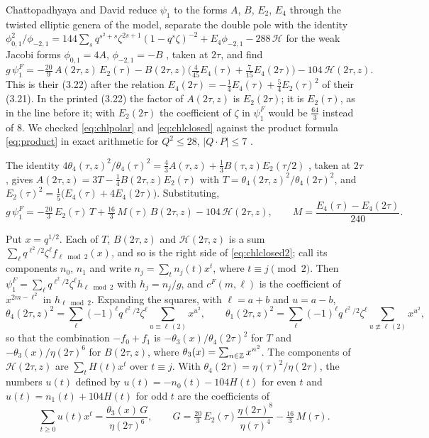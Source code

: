  Chattopadhyaya and David \cite[(3.12)--(3.22)]{CD19} reduce $\psi_1$ to the forms $A$, $B$, $E_2$, $E_4$ through the twisted elliptic genera of the model, separate the double pole with the identity $\phi_{0,1}^2/\phi_{-2,1}=144\sum_s q^{s^2+s}\zeta^{2s+1}(1-q^s\zeta)^{-2}+E_4\phi_{-2,1}-288\,\mathcal H$ for the weak Jacobi forms $\phi_{0,1}=4A$, $\phi_{-2,1}=-B$ \cite[Section~3]{BringmannMurthy13}, taken at $2\tau$, and find
\begin{equation}\label{eq:chlclosed}
g\,\psi_1^F=-\tfrac{20}{9}\,A(2\tau,z)\,E_2(\tau)-B(2\tau,z)\big(\tfrac4{45}E_4(\tau)+\tfrac7{15}E_4(2\tau)\big)-104\,\mathcal H(2\tau,z).
\end{equation}
This is their (3.22) after the relation $E_4(2\tau)=-\tfrac14E_4(\tau)+\tfrac54E_2(\tau)^2$ of their (3.21). In the printed (3.22) the factor of $A(2\tau,z)$ is $E_2(2\tau)$; it is $E_2(\tau)$, as in the line before it; with $E_2(2\tau)$ the coefficient of $\zeta$ in $\psi^F_1$ would be $\tfrac{64}{3}$ instead of $8$. We checked \eqref{eq:chlpolar} and \eqref{eq:chlclosed} against the product formula \eqref{eq:product} in exact arithmetic for $Q^2\le28$, $|Q\cdot P|\le7$ \cite{Bha26}.

The identity $4\theta_4(\tau,z)^2/\theta_4(\tau)^2=\tfrac43A(\tau,z)+\tfrac13B(\tau,z)E_2(\tau/2)$ \cite[(3.14)]{CD19}, taken at $2\tau$, gives $A(2\tau,z)=3T-\tfrac14B(2\tau,z)E_2(\tau)$ with $T=\theta_4(2\tau,z)^2/\theta_4(2\tau)^2$, and $E_2(\tau)^2=\tfrac15\big(E_4(\tau)+4E_4(2\tau)\big)$. Substituting,
\begin{equation}\label{eq:chlclosed2}
g\,\psi_1^F=-\tfrac{20}3\,E_2(\tau)\,T+\tfrac{16}3\,M(\tau)\,B(2\tau,z)-104\,\mathcal H(2\tau,z),\qquad M=\frac{E_4(\tau)-E_4(2\tau)}{240}.
\end{equation}

 Put $x=q^{1/2}$. Each of $T$, $B(2\tau,z)$ and $\mathcal H(2\tau,z)$ is a sum $\sum_\ell q^{\ell^2/2}\zeta^\ell f_{\ell\bmod2}(x)$, and so is the right side of \eqref{eq:chlclosed2}; call its components $n_0$, $n_1$ and write $n_j=\sum_t n_j(t)x^t$, where $t\equiv j \pmod 2$. Then $\psi_1^F=\sum_\ell q^{\ell^2/2}\zeta^\ell h_{\ell\bmod 2}$ with $h_j=n_j/g$, and $c^F(m,\ell)$ is the coefficient of $x^{2m-\ell^2}$ in $h_{\ell\bmod2}$. Expanding the squares, with $\ell=a+b$ and $u=a-b$,
\[
\theta_4(2\tau,z)^2=\sum_\ell(-1)^\ell q^{\ell^2/2}\zeta^\ell\!\!\sum_{u\equiv\ell\,(2)}\!\!x^{u^2},\qquad
\theta_1(2\tau,z)^2=\sum_\ell(-1)^\ell q^{\ell^2/2}\zeta^\ell\!\!\sum_{u\not\equiv\ell\,(2)}\!\!x^{u^2},
\]
so that the combination $-f_0+f_1$ is $-\theta_3(x)/\theta_4(2\tau)^2$ for $T$ and $-\theta_3(x)/\eta(2\tau)^6$ for $B(2\tau,z)$, where $\theta_3(x)=\sum_{n\in\mathbb{Z}}x^{n^2}$. The components of $\mathcal H(2\tau,z)$ are $\sum_t H(t)x^t$ over $t\equiv j$. With $\theta_4(2\tau)=\eta(\tau)^2/\eta(2\tau)$, the numbers $u(t)$ defined by $u(t)=-n_0(t)-104H(t)$ for even $t$ and $u(t)=n_1(t)+104H(t)$ for odd $t$ are the coefficients of
\begin{equation}\label{eq:chlS}
\sum_{t\ge0}u(t)x^t=\frac{\theta_3(x)\,G}{\eta(2\tau)^6},\qquad G=\tfrac{20}3\,E_2(\tau)\frac{\eta(2\tau)^8}{\eta(\tau)^4}-\tfrac{16}3\,M(\tau).
\end{equation}

